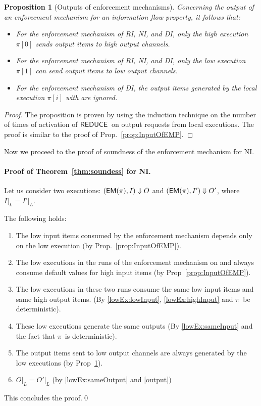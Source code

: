 \documentclass[10pt,a4paper,oneside]{article}
\newtheorem{proposition}{Proposition}[section]
\def\execution#1#2#3{\ensuremath{(#1, #2)\Downarrow#3}}
\def\loweq#1#2{\ensuremath{\restrict{#1}{L} = \restrict{#2}{L}}}
\def\restrict#1#2{\ensuremath{{#1}|_{#2}}}
\def\sanserif#1{\ensuremath{\sf #1}}
\def\REDUCE{\ensuremath{\sanserif{REDUCE}}}
\def\EM{\ensuremath{{\sanserif{EM}}}}
\def\Prog{\ensuremath{\pi}}
\def\Progl#1{\ensuremath{\Prog[#1]}}
\def\EMP{\ensuremath{\EM(}\ensuremath{\Prog)}}
\begin{document}
\begin{proposition}[Outputs of enforcement mechanisms]\label{prop:outputOfEMP}
Concerning the output of an enforcement mechanism for an information flow property, it follows that:
\begin{itemize}
\item For the enforcement mechanism of RI, NI, and DI, only the high execution \Progl{0} sends output items to high output channels.
\item For the enforcement mechanism of RI, NI,  and DI, only the low execution \Progl{1} can send output items to low output channels.
\item For the enforcement mechanism of DI, the output items generated by the local execution \Progl{i} with  are ignored.
\end{itemize}
\end{proposition}
\begin{proof}
The proposition is proven by using the induction technique on the number of times of activation of \REDUCE\ on  output requests from local executions. The proof is similar to the proof of Prop.~\ref{prop:InputOfEMP}.
\end{proof}



Now we proceed to the proof of soundness of the enforcement mechanism for NI.
\paragraph{Proof of Theorem~\ref{thm:soundess} for NI.}

Let us consider two executions: \execution{\EMP}{I}{O} and \execution{\EMP}{I'}{O'}, where \loweq{I}{I'}.  

The following holds:


\begin{enumerate}
\item The low input items consumed by the enforcement mechanism depends only on the low execution (by Prop.~\ref{prop:InputOfEMP}). \label{lowEx:lowInput}

\item The low executions in the runs of the enforcement mechanism on  and  always consume default values for high input items (by Prop~\ref{prop:InputOfEMP}). \label{lowEx:highInput}

\item  The low executions in these two runs consume the same low input items and same high output items. (By \ref{lowEx:lowInput}, \ref{lowEx:highInput} and \Prog\ be deterministic).  \label{lowEx:sameInput}

\item These low executions generate the same outputs (By \ref{lowEx:sameInput} and the fact that \Prog\ is deterministic). \label{lowEx:sameOutput}

\item The output items sent to low output channels are always generated by the low executions (by Prop~\ref{prop:outputOfEMP}). \label{output}

\item \loweq{O}{O'} (by \ref{lowEx:sameOutput} and \ref{output})
\end{enumerate}
This concludes the proof.\qed
\end{document}
